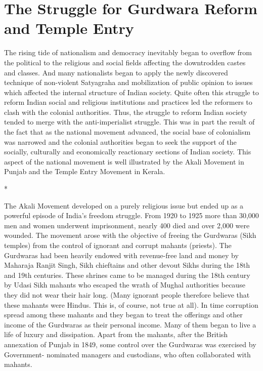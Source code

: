 \chapter[Struggle for Gurdwara Reform and Temple Entry]{The Struggle for Gurdwara Reform and Temple Entry}



The rising tide of nationalism and democracy inevitably began to overflow from the political to the religious and social fields affecting the downtrodden castes and classes. And many nationalists began to apply the newly discovered technique of non-violent Satyagraha and mobilization of public opinion to issues which affected the internal structure of Indian society. Quite often this struggle to reform Indian social and religious institutions and practices led the reformers to clash with the colonial authorities. Thus, the struggle to reform Indian society tended to merge with the anti-imperialist struggle. This was in part the result of the fact that as the national movement advanced, the social base of colonialism was narrowed and the colonial authorities began to seek the support of the socially, culturally and economically reactionary sections of Indian society. This aspect of the national movement is well illustrated by the Akali Movement in Punjab and the Temple Entry Movement in Kerala.

\begin{center}*\end{center}



The Akali Movement developed on a purely religious issue but ended up as a powerful episode of India’s freedom struggle. From 1920 to 1925 more than 30,000 men and women underwent imprisonment, nearly 400 died and over 2,000 were wounded. The movement arose with the objective of freeing the Gurdwaras (Sikh temples) from the control of ignorant and corrupt mahants (priests). The Gurdwaras had been heavily endowed with revenue-free land and money by Maharaja Ranjit Singh, Sikh chieftains and other devout Sikhs during the 18th and 19th centuries. These shrines came to be managed during the 18th century by Udasi Sikh mahants who escaped the wrath of Mughal authorities because they did not wear their hair long. (Many ignorant people therefore believe that these mahants were Hindus. This is, of course, not true at all). In time corruption spread among these mahants and they began to treat the offerings and other income of the Gurdwaras as their personal income. Many of them began to live a life of luxury and dissipation. Apart from the mahants, after the British annexation of Punjab in 1849, some control over the Gurdwaras was exercised by Government- nominated managers and custodians, who often collaborated with mahants.

